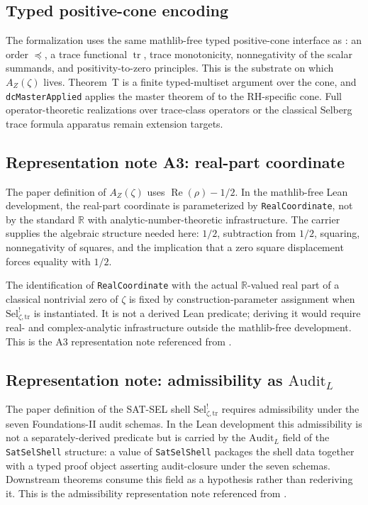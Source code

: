 \documentclass[11pt]{article}
\DeclareMathOperator{\trace}{tr}
\DeclareMathOperator{\Real}{Re}
\newcommand{\AZ}{A_{Z}(\zeta)}
\newcommand{\Sel}{\mathrm{Sel}^{!}_{\zeta,\mathrm{tr}}}
\theoremstyle{definition}
\begin{document}
\subsection*{Typed positive-cone encoding}

The formalization uses the same mathlib-free typed positive-cone
interface as \cite{TsiokosSDTC2026}: an order \(\preceq\), a trace
functional \(\trace\), trace monotonicity, nonnegativity of the scalar
summands, and positivity-to-zero principles.  This is the substrate on
which \(\AZ\) lives.  Theorem~T is a finite typed-multiset argument over
the cone, and \texttt{dcMasterApplied} applies the master theorem of
\cite{TsiokosSDTC2026} to the RH-specific cone.  Full operator-theoretic
realizations over trace-class operators \citep{Simon2005} or the
classical Selberg trace formula apparatus \citep{Hejhal1976,Hejhal1983}
remain extension targets.

\subsection*{Representation note A3: real-part coordinate}

The paper definition of \(\AZ\) uses \(\Real(\rho)-1/2\).  In the
mathlib-free Lean development, the real-part coordinate is parameterized
by \texttt{RealCoordinate}, not by the standard \(\mathbb{R}\) with
analytic-number-theoretic infrastructure.  The carrier supplies the
algebraic structure needed here: \(1/2\), subtraction from \(1/2\),
squaring, nonnegativity of squares, and the implication that a zero
square displacement forces equality with \(1/2\).

The identification of \texttt{RealCoordinate} with the actual
\(\mathbb{R}\)-valued real part of a classical nontrivial zero of
\(\zeta\) is fixed by construction-parameter assignment when \(\Sel\)
is instantiated.  It is not a derived Lean predicate; deriving it would
require real- and complex-analytic infrastructure outside the
mathlib-free development.  This is the A3 representation note referenced
from .

\subsection*{Representation note: admissibility as \(\mathrm{Audit}_L\)}

The paper definition of the SAT-SEL shell \(\Sel\) requires
admissibility under the seven Foundations-II audit schemas.  In the
Lean development this admissibility is not a separately-derived
predicate but is carried by the \(\mathrm{Audit}_L\) field of the
\nolinkurl{SatSelShell} structure: a value of \nolinkurl{SatSelShell}
packages the shell data together with a typed proof object asserting
audit-closure under the seven schemas.  Downstream theorems consume
this field as a hypothesis rather than rederiving it.  This is the
admissibility representation note referenced from
.
\end{document}
